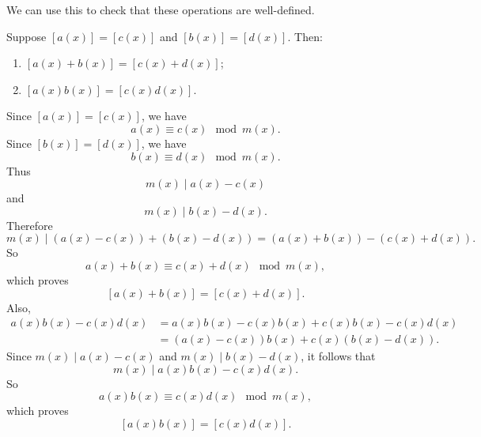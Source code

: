 We can use this to check that these operations are well-defined.

\begin{lemma}{
    Suppose $[a(x)]=[c(x)]$ and $[b(x)]=[d(x)]$.
    Then:
    \begin{enumerate}
        \item $[a(x)+b(x)]=[c(x)+d(x)]$;
        \item $[a(x)b(x)]=[c(x)d(x)]$.
    \end{enumerate}
}
    Since $[a(x)]=[c(x)]$, we have
    \[
        a(x)\equiv c(x)\mod m(x).
    \]
    Since $[b(x)]=[d(x)]$, we have
    \[
        b(x)\equiv d(x)\mod m(x).
    \]
    Thus
    \[
        m(x)\mid a(x)-c(x)
    \]
    and
    \[
        m(x)\mid b(x)-d(x).
    \]
    Therefore
    \[
        m(x)\mid (a(x)-c(x))+(b(x)-d(x))=(a(x)+b(x))-(c(x)+d(x)).
    \]
    So
    \[
        a(x)+b(x)\equiv c(x)+d(x)\mod m(x),
    \]
    which proves
    \[
        [a(x)+b(x)]=[c(x)+d(x)].
    \]
    Also,
    \begin{align*}
        a(x)b(x)-c(x)d(x)
        &= a(x)b(x)-c(x)b(x)+c(x)b(x)-c(x)d(x)\\
        &= (a(x)-c(x))b(x)+c(x)(b(x)-d(x)).
    \end{align*}
    Since $m(x)\mid a(x)-c(x)$ and $m(x)\mid b(x)-d(x)$, it follows that
    \[
        m(x)\mid a(x)b(x)-c(x)d(x).
    \]
    So
    \[
        a(x)b(x)\equiv c(x)d(x)\mod m(x),
    \]
    which proves
    \[
        [a(x)b(x)]=[c(x)d(x)].
    \]
\end{lemma}